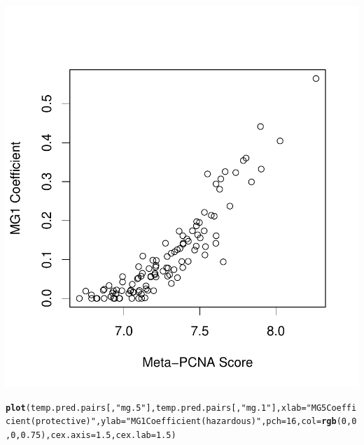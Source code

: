 \documentclass{article}\usepackage[]{graphicx}\usepackage[]{color}
\makeatletter
\def\maxwidth{ %
  \ifdim\Gin@nat@width>\linewidth
    \linewidth
  \else
    \Gin@nat@width
  \fi
}
\newcommand{\hlnum}[1]{\textcolor[rgb]{0.686,0.059,0.569}{#1}}%
\newcommand{\hlstr}[1]{\textcolor[rgb]{0.192,0.494,0.8}{#1}}%
\newcommand{\hlstd}[1]{\textcolor[rgb]{0.345,0.345,0.345}{#1}}%
\newcommand{\hlkwc}[1]{\textcolor[rgb]{0.333,0.667,0.333}{#1}}%
\newcommand{\hlkwd}[1]{\textcolor[rgb]{0.737,0.353,0.396}{\textbf{#1}}}%
\newenvironment{kframe}{%
 \def\at@end@of@kframe{}%
 \ifinner\ifhmode%
  \def\at@end@of@kframe{\end{minipage}}%
  \begin{minipage}{\columnwidth}%
 \fi\fi%
 \def\FrameCommand##1{\hskip\@totalleftmargin \hskip-\fboxsep
 \colorbox{shadecolor}{##1}\hskip-\fboxsep
     \hskip-\linewidth \hskip-\@totalleftmargin \hskip\columnwidth}%
 \MakeFramed {\advance\hsize-\width
   \@totalleftmargin\z@ \linewidth\hsize
   \@setminipage}}%
 {\par\unskip\endMakeFramed%
 \at@end@of@kframe}
\newenvironment{knitrout}{}{} %
\makeatother
\begin{document}
\begin{knitrout}
{\centering \includegraphics[width=\maxwidth]{figure/metagene-pairs-7} 

}


\begin{kframe}\begin{alltt}
\hlkwd{plot}\hlstd{(temp.pred.pairs[,}\hlstr{"mg.5"}\hlstd{], temp.pred.pairs[,}\hlstr{"mg.1"}\hlstd{],} \hlkwc{xlab} \hlstd{=} \hlstr{"MG5 Coefficient (protective)"}\hlstd{,} \hlkwc{ylab} \hlstd{=} \hlstr{"MG1 Coefficient (hazardous)"}\hlstd{,} \hlkwc{pch} \hlstd{=} \hlnum{16}\hlstd{,} \hlkwc{col} \hlstd{=} \hlkwd{rgb}\hlstd{(}\hlnum{0}\hlstd{,} \hlnum{0}\hlstd{,} \hlnum{0}\hlstd{,} \hlnum{0.75}\hlstd{),} \hlkwc{cex.axis} \hlstd{=} \hlnum{1.5}\hlstd{,} \hlkwc{cex.lab} \hlstd{=} \hlnum{1.5}\hlstd{)}
\end{alltt}
\end{kframe}


\end{knitrout}
\end{document}
